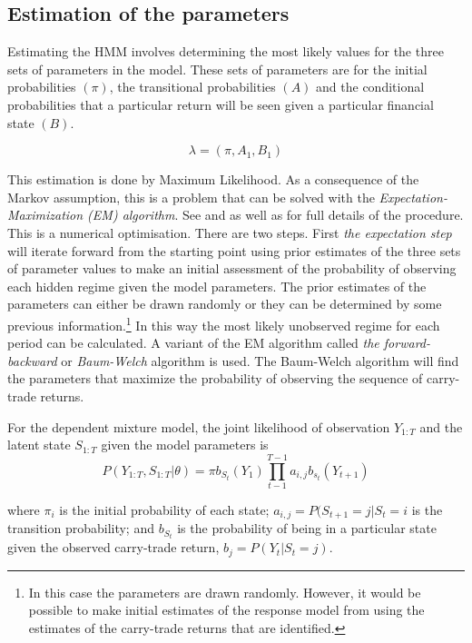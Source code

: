 \documentclass[12pt, a4paper, oneside]{article}\usepackage[]{graphicx}\usepackage[]{color}
\begin{document}
\subsection{Estimation of the parameters}
Estimating the HMM involves determining the most likely values for the three sets of parameters in the model.  These sets of parameters are for the initial probabilities $(\pi)$, the transitional probabilities $(A)$ and the conditional probabilities that a particular return will be seen given a particular financial state $(B)$.  

\begin{equation}
\lambda = (\pi, A_1, B_1)
\end{equation}

This estimation is done by Maximum Likelihood. As a consequence of the Markov assumption, this is a problem that can be solved with the \emph{Expectation-Maximization (EM) algorithm}.  See \citet{dempster1977maximum} and \citet{Hamilton1989} as well as \citet{depmixS4} for full details of the procedure.  This is a numerical optimisation.  There are two steps. First \emph{the expectation step} will iterate forward from the starting point using prior estimates of the three sets of parameter values  to make an initial assessment of the probability of observing each hidden regime given the model parameters.  The prior estimates of the parameters can either be drawn randomly or they can be determined by some previous information.\footnote{In this case the parameters are drawn randomly.  However, it would be possible to make initial estimates of the response model from \citet{Hayward2013} using the estimates of the carry-trade returns that are identified.}  In this way the most likely unobserved regime for each period can be calculated. A variant of the EM algorithm called \emph{the forward-backward} or \emph{Baum-Welch} algorithm \citet{Baum1970} is used.   The Baum-Welch algorithm will find the parameters that maximize the probability of observing the sequence of carry-trade returns.  

For the dependent mixture model, the joint likelihood of observation $Y_{1:T}$ and the latent state $S_{1:T}$ given the model parameters is 
\begin{equation}
P(Y_{1:T}, S_{1:T}|\theta) = \pi b_{S_t}(Y_1)\prod_{t-1}^{T-1} a_{i,j}b_{s_t}(Y_{t+1})
\end{equation}

where $\pi_i$ is the initial probability of each state; $a_{i,j} = P(S_{t+1} = j| S_t = i$ is the transition probability; and $b_{S_t}$ is the probability of being in a particular state given the observed carry-trade return, $b_j = P(Y_t|S_t = j)$.
\end{document}
